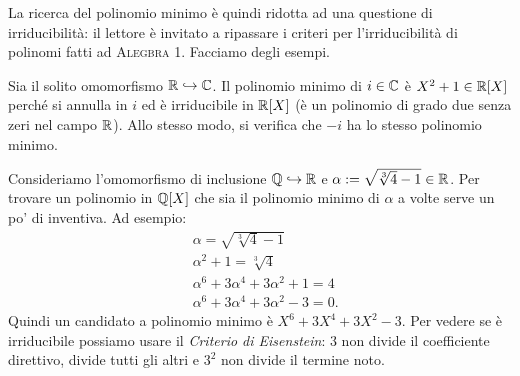 La ricerca del polinomio minimo è quindi ridotta ad una questione di irriducibilità: il lettore è invitato a ripassare i criteri per l'irriducibilità di polinomi fatti ad {\scshape Alegbra 1}. Facciamo degli esempi.

\begin{esem}
Sia il solito omomorfismo \(\mathbb{R} \hookrightarrow \mathbb{C}\). Il polinomio minimo di \(i \in \mathbb{C}\) è \(X^2+1 \in \mathbb{R}[X]\) perché si annulla in \(i\) ed è irriducibile in \(\mathbb{R}[X]\) (è un polinomio di grado due senza zeri nel campo \(\mathbb{R}\)). Allo stesso modo, si verifica che \(-i\) ha lo stesso polinomio minimo.
\end{esem}


\begin{esem}
Consideriamo l'omomorfismo di inclusione \(\mathbb{Q} \hookrightarrow \mathbb{R}\) e \(\alpha := \sqrt{\sqrt[3]{4} -1} \in \mathbb{R}\). Per trovare un polinomio in \(\mathbb{Q}[X]\) che sia il polinomio minimo di \(\alpha\) a volte serve un po' di inventiva. Ad esempio:
\begin{align*}
& \alpha = \sqrt{\sqrt[3]{4} -1} \\
& \alpha^2 + 1 = \sqrt[3]{4} \\
& \alpha^6 + 3\alpha^4 + 3\alpha^2 + 1 = 4 \\
& \alpha^6 + 3\alpha^4 + 3\alpha^2 - 3 = 0 .
\end{align*}
Quindi un candidato a polinomio minimo è \(X^6 + 3X^4 + 3X^2 - 3\). Per vedere se è irriducibile possiamo usare il {\em Criterio di \textgerman{Eisenstein}}: \(3\) non divide il coefficiente direttivo, divide tutti gli altri e \(3^2\) non divide il termine noto.
\end{esem}

